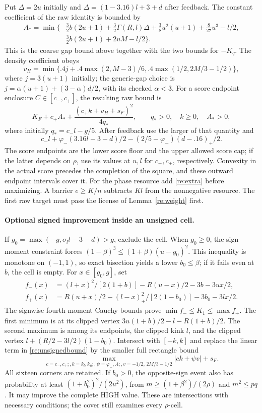 Put $\Delta=2u$ initially and $\Delta=(1-3.16)l+3+d$ after feedback.
The constant coefficient of the raw identity is bounded by
\begin{align*}
 A_* =\min\bigl\{&\tfrac32b(2u+1)+\tfrac32\Gamma(R,l)\Delta
       +\tfrac38u^2(u+1)+\tfrac8{27}u^3-l/2,\\
      &\tfrac32b(2u+1)+2uM-l/2\bigr\}.
\end{align*}
This is the coarse gap bound above together with the two bounds for
$-K_q$. The density coefficient obeys
\[
 v_H=\min\{.4j+.4\max(2,M-3)/6,
                     .4\max(1/2,2M/3-1/2)\},
\]
where $j=3(u+1)$ initially; the generic-gap choice is
$j=\alpha(u+1)+(3-\alpha)d/2$, with its checked $\alpha<3$.
For a score endpoint enclosure $C\in[c_-,c_+]$, the resulting raw
bound is
\begin{equation}\label{re:unsignedbound}
 K_F+c_+A_*+\frac{(c_+k+v_H+s_F)^2}{4q_*},
 \qquad q_*>0,\quad k\ge0,\quad A_*>0,
\end{equation}
where initially $q_*=c_-l-g/5$. After feedback use the larger of that
quantity and
\[
 c_-l+\varphi_-(3.16l-3-d)/2
                  -(2/5-\varphi_-)(d-.16)_+/2.
\]
The score endpoints are the lower score floor and the upper allowed
score cap; if the latter depends on $\rho$, use its values at $u,l$
for $c_-,c_+$, respectively. Convexity in the actual score precedes the
completion of the square, and these outward endpoint intervals cover it.
For the phase resource add \eqref{re:extra} before maximizing. A barrier
$e\ge K/n$ subtracts $K l$ from the nonnegative resource. The first raw
target must pass the license of Lemma~\ref{re:weight} first.

\paragraph{Optional signed improvement inside an unsigned cell.}
If $g_0=\max(-g,\sigma_l l-3-d)>g$, exclude the cell. When $g_0\ge0$,
the sign-moment constraint forces
$(1-\beta)^3\le(1+\beta)(u-g_0)^2$.
This inequality is monotone on $(-1,1)$, so exact bisection yields a
lower $b_0\le\beta$; if it fails even at $b$, the cell is empty.
For $x\in[g_0,g]$, set
\begin{align*}
 f_-(x)&=(l+x)^2/[2(1+b)]-R(u-x)/2-3b-3ux/2,\\
 f_+(x)&=R(u+x)/2-(l-x)_+^2/[2(1-b_0)]-3b_0-3lx/2.
\end{align*}
The signwise fourth-moment Cauchy bounds prove
$\min f_-\le K_1\le\max f_+$. The first minimum is at its clipped
vertex $3u(1+b)/2-l-R(1+b)/2$. The second maximum is among its endpoints,
the clipped kink $l$, and the clipped vertex
$l+(R/2-3l/2)(1-b_0)$. Intersect with $[-k,k]$ and replace the linear
term in \eqref{re:unsignedbound} by the smaller full rectangle bound
\[
 \max_{c=c_-,c_+;,k=k_l,k_u;,\psi=\varphi_-,.4;,
             v=-1/2,\,2M/3-1/2}|ck+\psi v|+s_F.
\]
All sixteen corners are retained. If $b_0>0$, the opposite-sign event
also has probability at least $(1+b_0^2)^2/(2u^2)$, from
$m\ge(1+\beta^2)/(2\rho)$ and $m^2\le pq$. It may improve the complete
HIGH value. These are intersections with necessary conditions; the cover
still examines every $\rho$-cell.

